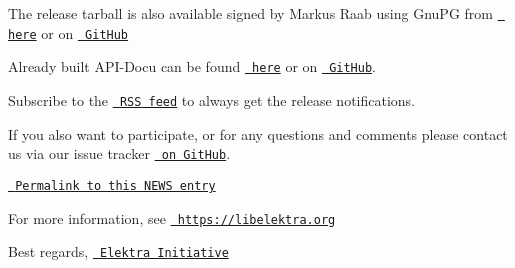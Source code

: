 The release tarball is also available signed by Markus Raab using Gnu\+PG from \href{https://www.libelektra.org/ftp/elektra/releases/elektra-0.9.0.tar.gz.gpg}{\texttt{ here}} or on \href{https://github.com/ElektraInitiative/ftp/blob/master/releases/elektra-0.9.0.tar.gz.gpg?raw=true}{\texttt{ Git\+Hub}}

Already built A\+P\+I-\/\+Docu can be found \href{https://doc.libelektra.org/api/0.9.0/html/}{\texttt{ here}} or on \href{https://github.com/ElektraInitiative/doc/tree/master/api/0.9.0}{\texttt{ Git\+Hub}}.

Subscribe to the \href{https://www.libelektra.org/news/feed.rss}{\texttt{ R\+SS feed}} to always get the release notifications.

If you also want to participate, or for any questions and comments please contact us via our issue tracker \href{http://issues.libelektra.org}{\texttt{ on Git\+Hub}}.

\href{https://www.libelektra.org/news/0.9.0-release}{\texttt{ Permalink to this N\+E\+WS entry}}

For more information, see \href{https://libelektra.org}{\texttt{ https\+://libelektra.\+org}}

Best regards, \href{https://www.libelektra.org/developers/authors}{\texttt{ Elektra Initiative}} 